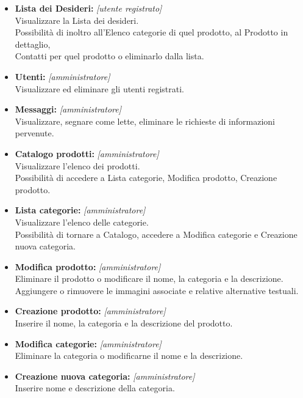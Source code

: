 \documentclass[a4paper, 11pt]{article}
\begin{document}
\begin{itemize}
	\item \textbf{Lista dei Desideri:}	\textit{[utente registrato]} \\
	Visualizzare la Lista dei desideri.  \\
	Possibilità di inoltro all’Elenco categorie di quel prodotto, al Prodotto in dettaglio, \\
	Contatti per quel prodotto o eliminarlo dalla lista.

	\item \textbf{Utenti:} \textit {[amministratore]} \\
	Visualizzare ed eliminare gli utenti registrati.
	
   \item \textbf{Messaggi:} \textit{[amministratore]} \\
   Visualizzare, segnare come lette, eliminare le richieste di informazioni pervenute.
   
	\item \textbf{Catalogo prodotti:} \textit{[amministratore]} \\
	Visualizzare l’elenco dei prodotti. \\
   Possibilità di accedere a Lista categorie, Modifica prodotto, Creazione prodotto.

	\item \textbf{Lista categorie:} \textit{[amministratore]} \\
	Visualizzare l’elenco delle categorie.\\
	Possibilità di tornare a Catalogo, accedere a Modifica categorie e Creazione nuova categoria.

	\item \textbf{Modifica prodotto:} \textit {[amministratore]} \\
	Eliminare il prodotto o modificare il nome, la categoria e la descrizione. \\
	Aggiungere o rimuovere le immagini associate e relative alternative testuali. 

	\item \textbf{Creazione prodotto:} \textit {[amministratore]} \\
	Inserire il nome, la categoria e la descrizione del prodotto.

	
	\item \textbf{Modifica categorie:} \textit {[amministratore]} \\
	Eliminare la categoria o modificarne il nome e la descrizione.

	\item \textbf{Creazione nuova categoria:} \textit {[amministratore]} \\
	Inserire nome e descrizione della categoria.
	
\end{itemize}
\end{document}
